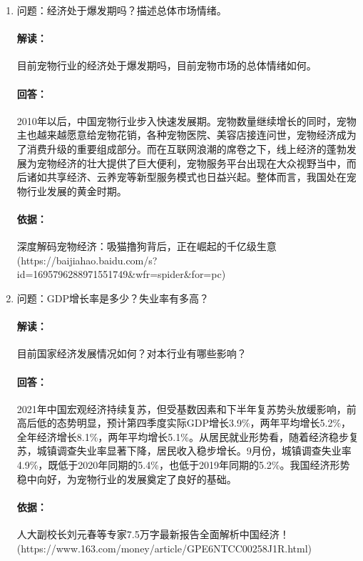 \documentclass[a4paper]{ctexart}
\begin{document}
\begin{enumerate}[label=\alph*.]
  \item 问题：经济处于爆发期吗？描述总体市场情绪。
  \paragraph{解读：}目前宠物行业的经济处于爆发期吗，目前宠物市场的总体情绪如何。
  \paragraph{回答：}2010年以后，中国宠物行业步入快速发展期。宠物数量继续增长的同时，宠物主也越来越愿意给宠物花销，各种宠物医院、美容店接连问世，宠物经济成为了消费升级的重要组成部分。而在互联网浪潮的席卷之下，线上经济的蓬勃发展为宠物经济的壮大提供了巨大便利，宠物服务平台出现在大众视野当中，而后诸如共享经济、云养宠等新型服务模式也日益兴起。整体而言，我国处在宠物行业发展的黄金时期。
  \paragraph{依据：}深度解码宠物经济：吸猫撸狗背后，正在崛起的千亿级生意\\ (https://baijiahao.baidu.com/s?id=1695796288971551749\&wfr=spider\&for=pc)
  \item 问题：GDP增长率是多少？失业率有多高？
  \paragraph{解读：}目前国家经济发展情况如何？对本行业有哪些影响？
  \paragraph{回答：}2021年中国宏观经济持续复苏，但受基数因素和下半年复苏势头放缓影响，前高后低的态势明显，预计第四季度实际GDP增长3.9\%，两年平均增长5.2\%，全年经济增长8.1\%，两年平均增长5.1\%。从居民就业形势看，随着经济稳步复苏，城镇调查失业率显著下降，居民收入稳步增长。9月份，城镇调查失业率4.9\%，既低于2020年同期的5.4\%，也低于2019年同期的5.2\%。我国经济形势稳中向好，为宠物行业的发展奠定了良好的基础。
  \paragraph{依据：}人大副校长刘元春等专家7.5万字最新报告全面解析中国经济！\\(https://www.163.com/money/article/GPE6NTCC00258J1R.html)
\end{enumerate}
\end{document}
